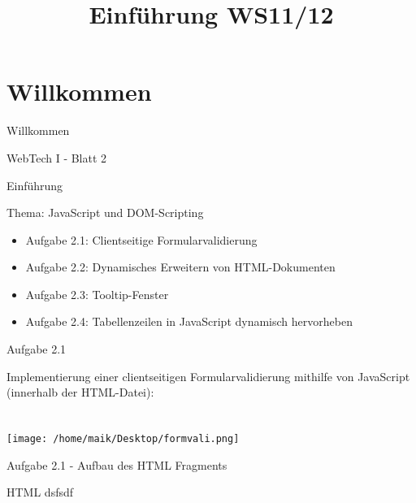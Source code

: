 \documentclass{beamer}
\title{Einführung WS11/12}
\begin{document}
\section{Willkommen}
\begin{frame}{Willkommen}
\begin{center}
\huge
WebTech I - Blatt 2
\vspace{7mm}

\end{center}
\end{frame}

\begin{frame}{Einführung}
\begin{center}Thema: JavaScript und DOM-Scripting\end{center}
\begin{itemize}
\item Aufgabe 2.1: Clientseitige Formularvalidierung
\item Aufgabe 2.2: Dynamisches Erweitern von HTML-Dokumenten
\item Aufgabe 2.3: Tooltip-Fenster
\item Aufgabe 2.4: Tabellenzeilen in JavaScript dynamisch hervorheben
\end{itemize}
\end{frame}

\begin{frame}{Aufgabe 2.1}
\begin{center}
Implementierung einer clientseitigen Formularvalidierung mithilfe von JavaScript (innerhalb der HTML-Datei):\\
~\\~\\
\texttt{[image: /home/maik/Desktop/formvali.png]}
\end{center}
\end{frame}

\begin{frame}{Aufgabe 2.1 - Aufbau des HTML Fragments}
\begin{block}{HTML}
dsfsdf
\end{block}

\end{frame}
\end{document}
